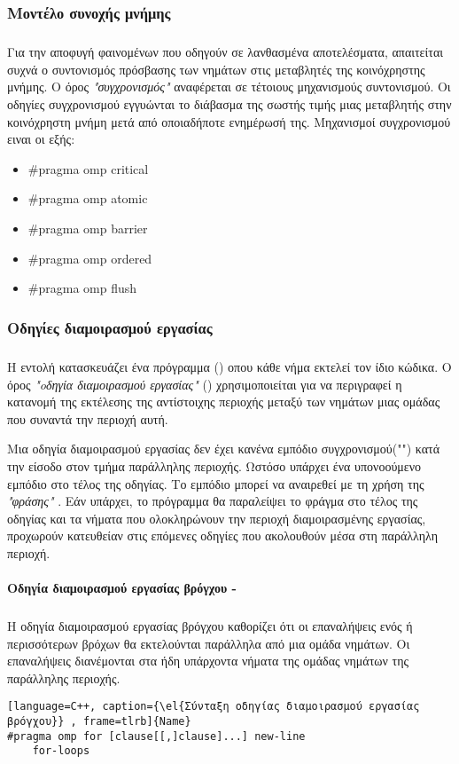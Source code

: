 \subsubsection{Μοντέλο συνοχής μνήμης}
\subparagraph{}
Για την αποφυγή φαινομένων \emph{} που οδηγούν σε λανθασμένα αποτελέσματα, απαιτείται συχνά ο συντονισμός πρόσβασης των νημάτων στις μεταβλητές της κοινόχρηστης μνήμης. Ο όρος \emph{"συγχρονισμός"} αναφέρεται σε τέτοιους μηχανισμούς συντονισμού. Οι οδηγίες συγχρονισμού εγγυώνται το διάβασμα της σωστής τιμής μιας μεταβλητής στην κοινόχρηστη μνήμη μετά από οποιαδήποτε ενημέρωσή της. Μηχανισμοί συγχρονισμού ειναι οι εξής\cite{book2_23}:
\begin{itemize}
    \item {\#}pragma omp critical 
    \item {\#}pragma omp atomic
    \item {\#}pragma omp barrier 
    \item {\#}pragma omp ordered
    \item {\#}pragma omp flush
\end{itemize}

\subsubsection{Οδηγίες διαμοιρασμού εργασίας}
\subparagraph{}
Η εντολή \emph{} κατασκευάζει ένα \emph{} πρόγραμμα (\emph{}) οπου κάθε νήμα εκτελεί τον ίδιο κώδικα. Ο όρος \emph{"oδηγία διαμοιρασμού εργασίας"} (\emph{}) χρησιμοποιείται για να περιγραφεί η κατανομή της εκτέλεσης της αντίστοιχης περιοχής μεταξύ των νημάτων μιας ομάδας που συναντά την περιοχή αυτή.

Μια οδηγία διαμοιρασμού εργασίας δεν έχει κανένα εμπόδιο συγχρονισμού("\emph{}") κατά την είσοδο στον τμήμα παράλληλης περιοχής. Ωστόσο υπάρχει ένα υπονοούμενο εμπόδιο στο τέλος της οδηγίας. Το εμπόδιο μπορεί να αναιρεθεί με τη χρήση της \emph{"φράσης"}  \emph{}. Εάν υπάρχει, το πρόγραμμα θα παραλείψει το φράγμα στο τέλος της οδηγίας και τα νήματα που ολοκληρώνουν την περιοχή διαμοιρασμένης εργασίας, προχωρούν κατευθείαν στις επόμενες οδηγίες που ακολουθούν μέσα στη παράλληλη περιοχή\cite{openmpse16}.
\clearpage
\paragraph{Οδηγία διαμοιρασμού εργασίας βρόγχου - }
\subparagraph{}
Η οδηγία διαμοιρασμού εργασίας βρόγχου καθορίζει ότι οι επαναλήψεις ενός ή περισσότερων βρόχων θα εκτελούνται παράλληλα από μια ομάδα νημάτων. Οι επαναλήψεις διανέμονται στα ήδη υπάρχοντα νήματα της ομάδας νημάτων της παράλληλης περιοχής.
\ \\
\begin{lstlisting}[language=C++, caption={\el{Σύνταξη οδηγίας διαμοιρασμού εργασίας βρόγχου}} , frame=tlrb]{Name}
#pragma omp for [clause[[,]clause]...] new-line
	for-loops
\end{lstlisting}

